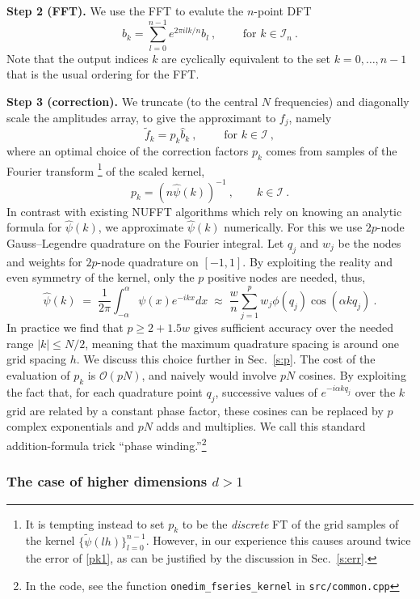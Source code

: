 \documentclass[10pt]{article}
\newcommand{\be}{\begin{equation}}
\newcommand{\ee}{\end{equation}}
\newcommand{\bigO}{{\mathcal O}}
\newcommand{\KK}{{\mathcal I}}     %
\newcommand{\ppsi}{{\tilde\psi}}   %
\newcommand{\al}{\alpha}           %
\begin{document}
{\bf Step 2 (FFT).}
We use the FFT to evalute the $n$-point DFT
\be
\hat{b}_k = \sum_{l=0}^{n-1} e^{2\pi i lk/n} b_l ~, \qquad \mbox{ for } k\in\KK_n
~.
\label{dft1}
\ee
Note that the output indices $k$ are cyclically equivalent to the
set $k=0,\dots,n-1$ that is the usual ordering for the FFT.

{\bf Step 3 (correction).}
We truncate (to the central $N$ frequencies) and
diagonally scale the amplitudes array, to give
the approximant to $f_j$, namely
\be
\tilde f_k = p_k \hat{b}_k ~, \qquad \mbox{ for } k\in\KK
~,
\ee
where an optimal choice of the correction factors $p_k$ comes from
samples of the Fourier transform%
\footnote{It is tempting instead to set $p_k$ to be the {\em discrete} FT
  of the grid samples of the kernel $\{\ppsi(lh)\}_{l=0}^{n-1}$.
  However, in our
  experience this causes around twice the error of \eqref{pk1},
  as can be justified by the discussion in Sec.~\ref{s:err}.}
of the scaled kernel,
\be p_k = (n \hat\psi(k))^{-1}~, \qquad k\in\KK
\label{pk1}
~.
\ee
In contrast with existing NUFFT algorithms
which rely on knowing an analytic formula for $\hat\psi(k)$,
we approximate $\hat\psi(k)$
numerically. For this we use $2p$-node Gauss--Legendre quadrature
on the Fourier integral. Let $q_j$ and $w_j$ be the nodes and weights
for $2p$-node quadrature on $[-1,1]$.
By exploiting the reality and even symmetry of the kernel,
only the $p$ positive nodes are needed, thus,
$$
\hat\psi(k) \;=\; 
\frac{1}{2\pi} \int_{-\al}^{\al} \psi(x) e^{-ikx} dx
\;\approx\;
\frac{w}{n} \sum_{j=1}^p w_j \phi(q_j) \cos (\al k q_j)
~.
$$
In practice we find that $p\ge 2+1.5 w$ gives sufficient accuracy
over the needed range $|k|\le N/2$,
meaning that the maximum quadrature spacing is around one
grid spacing $h$.
We discuss this choice further in Sec.~\ref{s:p}.
The cost of the evaluation of $p_k$ is $\bigO(pN)$,
and naively would involve $pN$ cosines.
By exploiting the fact that, for each quadrature point $q_j$,
successive values of $e^{-i \al k q_j}$ over the $k$ grid are
related by a constant phase factor, these cosines
can be replaced by $p$ complex exponentials and $pN$ adds and multiplies.
We call this standard addition-formula trick
``phase winding.''\footnote{In the code, see the function
  {\tt onedim\_fseries\_kernel} in {\tt src/common.cpp}}
  


\subsubsection{The case of higher dimensions $d>1$}
\end{document}

